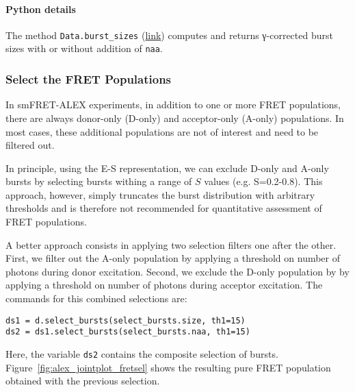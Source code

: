 \paragraph{Python details} The method \verb|Data.burst_sizes| 
(\href{http://fretbursts.readthedocs.org/en/latest/data_class.html#fretbursts.burstlib.Data.burst_sizes}{link})
computes and returns γ-corrected burst sizes with or without addition of \verb|naa|.

\subsubsection{Select the FRET Populations}

In smFRET-ALEX experiments, in addition to one or more FRET populations, there are always
donor-only (D-only) and acceptor-only (A-only) populations. 
In most cases, these additional populations are not of interest and need to be filtered out.

In principle, using the E-S representation, we can exclude D-only and A-only bursts
by selecting bursts withing a range of $S$ values (e.g. S=0.2-0.8). 
This approach, however, simply truncates the burst distribution with arbitrary 
thresholds and is therefore not recommended for quantitative assessment of FRET 
populations.

A better approach consists in applying two selection filters one after the other.
First, we filter out the A-only population 
by applying a threshold on number of photons during donor excitation.
Second, we exclude the D-only population by
by applying a threshold on number of photons during acceptor excitation.
The commands for this combined selections are:

\begin{lstlisting}
ds1 = d.select_bursts(select_bursts.size, th1=15)
ds2 = ds1.select_bursts(select_bursts.naa, th1=15)
\end{lstlisting}

Here, the variable \verb|ds2| contains the composite selection of bursts.
Figure~\ref{fig:alex_jointplot_fretsel} shows the resulting pure FRET
population obtained with the previous selection.